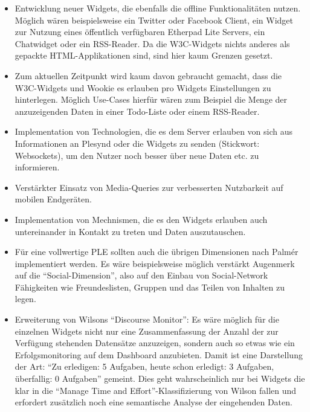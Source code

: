 \begin{itemize}
 \item Entwicklung neuer Widgets, die ebenfalls die offline Funktionalitäten nutzen. Möglich wären beispielsweise ein Twitter oder Facebook Client, ein Widget zur Nutzung eines öffentlich verfügbaren Etherpad Lite Servers, ein Chatwidget oder ein RSS-Reader. Da die W3C-Widgets nichts anderes als gepackte HTML-Applikationen sind, sind hier kaum Grenzen gesetzt.
 \item Zum aktuellen Zeitpunkt wird kaum davon gebraucht gemacht, dass die W3C-Widgets und Wookie es erlauben pro Widgets Einstellungen zu hinterlegen. Möglich Use-Cases hierfür wären zum Beispiel die Menge der anzuzeigenden Daten in einer Todo-Liste oder einem RSS-Reader.
 \item Implementation von Technologien, die es dem Server erlauben von sich aus Informationen an Plesynd oder die Widgets zu senden (Stickwort: Websockets), um den Nutzer noch besser über neue Daten etc. zu informieren.
 \item Verstärkter Einsatz von Media-Queries zur verbesserten Nutzbarkeit auf mobilen Endgeräten.
 \item Implementation von Mechnismen, die es den Widgets erlauben auch untereinander in Kontakt zu treten und Daten auszutauschen.
 \item Für eine vollwertige PLE sollten auch die übrigen Dimensionen nach Palmér implementiert werden. Es wäre beispielsweise möglich verstärkt Augenmerk auf die "`Social-Dimension"', also auf den Einbau von Social-Network Fähigkeiten wie Freundeslisten, Gruppen und das Teilen von Inhalten zu legen.
 \item Erweiterung von Wilsons "`Discourse Monitor"': Es wäre möglich für die einzelnen Widgets nicht nur eine Zusammenfassung der Anzahl der zur Verfügung stehenden Datensätze anzuzeigen, sondern auch so etwas wie ein Erfolgsmonitoring auf dem Dashboard anzubieten. Damit ist eine Darstellung der Art: "`Zu erledigen: 5 Aufgaben, heute schon erledigt: 3 Aufgaben, überfallig: 0 Aufgaben"' gemeint. Dies geht wahrscheinlich nur bei Widgets die klar in die “Manage Time and Effort”-Klassifizierung von Wilson fallen und erfordert zusätzlich noch eine semantische Analyse der eingehenden Daten.
\end{itemize}




